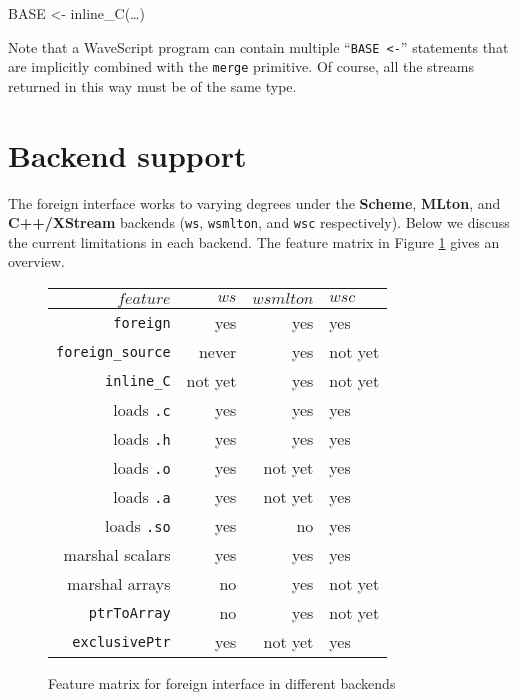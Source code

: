 \begin{wscode}
BASE <- inline\_C(\dots)
\end{wscode}

Note that a WaveScript program can contain multiple ``{\tt BASE <-}''
statements that are implicitly combined with the {\tt merge}
primitive.  Of course, all the streams returned in this way must be of
the same type.
%




\section{Backend support}

The foreign interface works to varying degrees under the {\bf Scheme},
 {\bf MLton}, and {\bf C++/XStream} backends ({\tt ws}, {\tt wsmlton},
 and {\tt wsc} respectively).  Below we discuss the current  limitations in each
 backend.  The feature matrix in Figure \ref{f:features} gives an
 overview.

\begin{figure}
\begin{center}
\begin{tabular}{|r|r|r|l|}
\hline $feature$ & $ws$ & $wsmlton$ & $wsc$ \\
\hline

{\tt foreign}         & yes     & yes & yes \\
{\tt foreign\_source} & never   & yes & not yet \\
{\tt inline\_C}       & not yet & yes & not yet \\

loads {\tt .c}        & yes     & yes     & yes \\
loads {\tt .h}        & yes     & yes     & yes \\
loads {\tt .o}        & yes     & not yet & yes \\
loads {\tt .a}        & yes     & not yet & yes \\
loads {\tt .so}       & yes     & no      & yes \\


marshal scalars    & yes     & yes      & yes \\
marshal arrays     & no      & yes      & not yet \\
{\tt ptrToArray}   & no      & yes      & not yet \\
{\tt exclusivePtr} & yes     & not yet  & yes \\

\hline
\end{tabular}
\end{center}
\caption{Feature matrix for foreign interface in different backends}
\label{f:features}
\end{figure}

